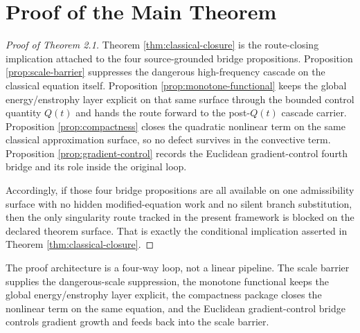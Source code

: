\section{Proof of the Main Theorem}

\begin{proof}[Proof of Theorem 2.1]
Theorem \ref{thm:classical-closure} is the route-closing implication attached to the four source-grounded bridge propositions. Proposition \ref{prop:scale-barrier} suppresses the dangerous high-frequency cascade on the classical equation itself. Proposition \ref{prop:monotone-functional} keeps the global energy/enstrophy layer explicit on that same surface through the bounded control quantity \(Q(t)\) and hands the route forward to the post-\(Q(t)\) cascade carrier. Proposition \ref{prop:compactness} closes the quadratic nonlinear term on the same classical approximation surface, so no defect survives in the convective term. Proposition \ref{prop:gradient-control} records the Euclidean gradient-control fourth bridge and its role inside the original loop.

Accordingly, if those four bridge propositions are all available on one
admissibility surface with no hidden modified-equation work and no silent
branch substitution, then the only singularity route tracked in the present
framework is blocked on the declared theorem surface. That is exactly the
conditional implication asserted in Theorem \ref{thm:classical-closure}.
\end{proof}

\begin{remark}
The proof architecture is a four-way loop, not a linear pipeline. The scale barrier supplies the dangerous-scale suppression, the monotone functional keeps the global energy/enstrophy layer explicit, the compactness package closes the nonlinear term on the same equation, and the Euclidean gradient-control bridge controls gradient growth and feeds back into the scale barrier.
\end{remark}
